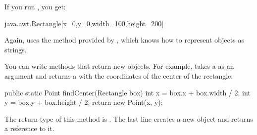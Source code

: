 If you run , you get:

\begin{stdout}
java.awt.Rectangle[x=0,y=0,width=100,height=200]
\end{stdout}

Again,  uses the  method provided by , which knows how to represent  objects as strings.


You can write methods that return new objects.
For example,  takes a  as an argument and returns a  with the coordinates of the center of the rectangle:

\begin{code}
public static Point findCenter(Rectangle box) {
    int x = box.x + box.width / 2;
    int y = box.y + box.height / 2;
    return new Point(x, y);
}
\end{code}

The return type of this method is .
The last line creates a new  object and returns a reference to it.



%
%
%
%
%
%

